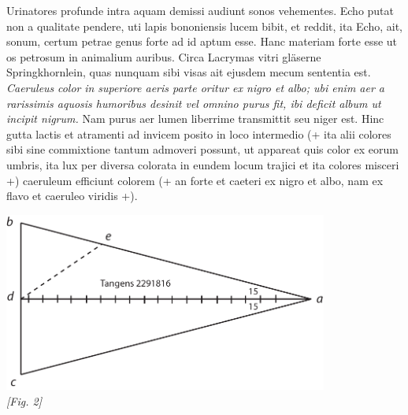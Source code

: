                      \pend
                      \pstart 
                       Urinatores profunde intra  aquam demissi audiunt sonos\protect{} vehementes. Echo  putat non a  qualitate pendere, uti lapis bononiensis\protect{} lucem\protect{} bibit,  et reddit, ita Echo, ait, sonum\protect{}, certum petrae  genus forte ad id aptum esse. Hanc materiam forte esse  ut os petrosum in animalium\protect{} auribus.
                      \pend 
                      \pstart {} Circa  Lacrymas vitri gl\"{a}serne Springkhornlein\protect{}, quas nunquam sibi visas  ait ejusdem mecum sententia est.\pend \pstart {} \textit{Caeruleus }\textit{color}\protect{}\textit{ in superiore  aeris parte oritur ex nigro et albo; ubi enim aer  a rarissimis aquosis humoribus desinit vel omnino purus  fit, ibi deficit album ut incipit nigrum.} Nam  purus aer lumen\protect{} liberrime transmittit seu niger  est. Hinc gutta lactis et atramenti ad invicem  posito in loco intermedio (+  ita alii colores sibi  sine commixtione tantum admoveri possunt,  ut appareat quis color\protect{} ex eorum umbris, ita lux\protect{} per diversa colorata in eundem locum trajici  et ita colores\protect{} misceri +) caeruleum efficiunt colorem\protect{}  (+ an forte et caeteri ex nigro et albo, nam ex flavo  et caeruleo viridis +).
                      \pend                 
                       \begin{center}        
                \includegraphics[width=0.8\textwidth]{images/99v}\\\textit{[Fig. 2]}
                        \end{center}
